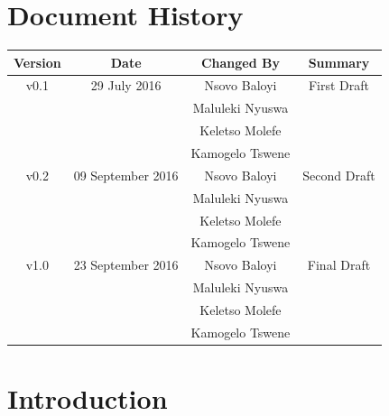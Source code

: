 \documentclass[a4paper,12pt]{article}
\begin{document}
	\newpage
	
	\tableofcontents
	\newpage
	\section*{Document History}
	
	\begin{table}[h!]
		
		\centering %
		\begin{tabular}{c c c c} %
			\hline\hline %
			Version & Date & Changed By & Summary \\ [0.5ex] %
			\hline %
			v0.1 & 29 July 2016 & Nsovo Baloyi & First Draft 
			\\ & & Maluleki Nyuswa &  
			\\ & & Keletso Molefe &
			\\ & & Kamogelo Tswene & \\ [1ex] 
			\hline
			v0.2 & 09 September 2016 & Nsovo Baloyi & Second Draft 
			\\ & & Maluleki Nyuswa &  
			\\ & & Keletso Molefe &
			\\ & & Kamogelo Tswene & \\ [1ex] 
			\hline
			v1.0 & 23 September 2016 & Nsovo Baloyi & Final Draft 
			\\ & & Maluleki Nyuswa &  
			\\ & & Keletso Molefe &
			\\ & & Kamogelo Tswene & \\ [1ex] 
			\hline \hline
		\end{tabular}
		\label{table:nonlin} %
	\end{table}

	\newpage
	
	\section{Introduction}	
	
\end{document}
